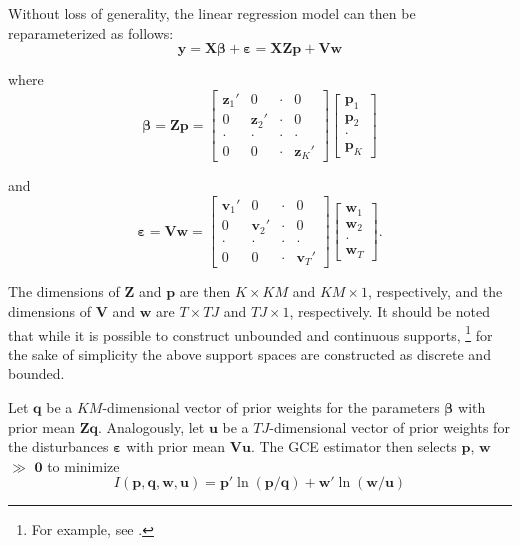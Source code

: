 \documentclass[english]{article}
\begin{document}
Without loss of generality, the linear regression model can then be 
reparameterized as follows:
\begin{equation}
\mathbf{y} = \mathbf{X\beta} + \mathbf{\varepsilon} = 
\mathbf{X Z p} + \mathbf{V w}
\end{equation}

\noindent
where 
\begin{equation}
\mathbf{\beta} = \mathbf{Zp} = 
\left[ \begin{array}{cccc}
\mathbf{z}_1' & 0 & \cdot & 0 \\
0  & \mathbf{z}_2' & \cdot & 0 \\
\cdot  & \cdot  & \cdot & \cdot  \\
0 & 0 & \cdot & \mathbf{z}_K'
\end{array}\right]
\left[ \begin{array}{c}
\mathbf{p}_1 \\
\mathbf{p}_2 \\
\cdot \\
\mathbf{p}_K 
\end{array}\right]
\end{equation}

\noindent
and 
\begin{equation}
\mathbf{\varepsilon} = \mathbf{Vw} = 
\left[ \begin{array}{cccc}
\mathbf{v}_1' & 0 & \cdot & 0 \\
0  & \mathbf{v}_2' & \cdot & 0 \\
\cdot  & \cdot  & \cdot & \cdot  \\
0 & 0 & \cdot & \mathbf{v}_T'
\end{array}\right]
\left[ \begin{array}{c}
\mathbf{w}_1 \\
\mathbf{w}_2 \\
\cdot \\
\mathbf{w}_T 
\end{array}\right].
\end{equation}

\noindent
The dimensions of $\mathbf{Z}$ and $\mathbf{p}$ are then 
$K \times KM$ and $KM \times 1$, respectively, and the dimensions of 
$\mathbf{V}$ and $\mathbf{w}$ are $T \times TJ$ and $TJ \times 1$, 
respectively.
It should be noted that while it is possible to construct unbounded and 
continuous supports,%
\footnote{For example, see \citet{golan2002}.}
for the sake of simplicity the above support spaces are constructed as 
discrete and bounded. 

Let $\mathbf{q}$ be a $KM$-dimensional vector of prior weights for the 
parameters $\mathbf{\beta}$ with prior mean $\mathbf{Zq}$.
Analogously, let $\mathbf{u}$ be a $TJ$-dimensional vector of prior weights 
for the disturbances $\mathbf{\varepsilon}$ with prior mean $\mathbf{Vu}$.
The GCE estimator then selects $\mathbf{p}$, $\mathbf{w}$ $\gg$ 
$\mathbf{0}$ to minimize 
\begin{equation}
I({\mathbf{p}, \mathbf{q}, \mathbf{w}, \mathbf{u}}) = 
\mathbf{p}' \ln (\mathbf{p}/\mathbf{q}) + 
\mathbf{w}' \ln (\mathbf{w}/\mathbf{u})
\end{equation}
\end{document}
